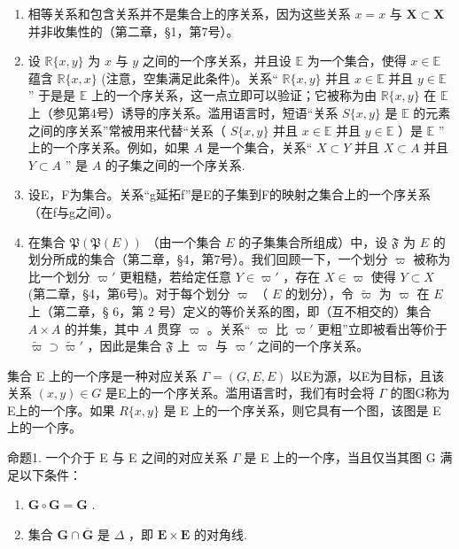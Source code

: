\begin{enumerate}
\def\labelenumi{(\arabic{enumi})}
\item
  相等关系和包含关系并不是集合上的序关系，因为这些关系 \(x = x\) 与 \(\mathbf{X} \subset \mathbf{X}\) 并非收集性的（第二章，§1，第7号）。
\item
  设 \(\mathbb{R}\{x, y\}\) 为 \(x\) 与 \(y\) 之间的一个序关系，并且设 \(\mathbb{E}\) 为一个集合，使得 \(x \in \mathbb{E}\) 蕴含 \(\mathbb{R}\{x, x\}\) (注意，空集满足此条件)。关系“ \(\mathbb{R}\{x, y\}\) 并且 \(x \in \mathbb{E}\) 并且 \(y \in \mathbb{E}\) '' 于是是 \(\mathbb{E}\) 上的一个序关系，这一点立即可以验证；它被称为由 \(\mathbb{R}\{x, y\}\) 在 \(\mathbb{E}\) 上（参见第4号）诱导的序关系。滥用语言时，短语“关系 \(S\{x, y\}\) 是 \(\mathbb{E}\) 的元素之间的序关系”常被用来代替“关系（ \(S\{x, y\}\) 并且 \(x \in \mathbb{E}\) 并且 \(y \in \mathbb{E}\) ）是 \(\mathbb{E}\) '' 上的一个序关系。例如，如果 \(A\) 是一个集合，关系“ \(X \subset Y\) 并且 \(X \subset A\) 并且 \(Y \subset A\) '' 是 \(A\) 的子集之间的一个序关系.
\item
  设E，F为集合。关系“g延拓f”是E的子集到F的映射之集合上的一个序关系（在f与g之间）。
\item
  在集合 \(\mathfrak{P}(\mathfrak{P}(E))\) （由一个集合 \(E\) 的子集集合所组成）中，设 \(\mathfrak{F}\) 为 \(E\) 的划分所成的集合（第二章，§4，第7号）。我们回顾一下，一个划分 \(\varpi\) 被称为比一个划分 \(\varpi'\) 更粗糙，若给定任意 \(Y \in \varpi'\) ，存在 \(X \in \varpi\) 使得 \(Y \subset X\) (第二章，§4，第6号)。对于每个划分 \(\varpi\) （ \(E\) 的划分），令 \(\tilde{\varpi}\) 为 \(\varpi\) 在 \(E\) 上（第二章，§ 6，第 2 号）定义的等价关系的图，即（互不相交的）集合 \(A \times A\) 的并集，其中 \(A\) 贯穿 \(\varpi\) 。关系“ \(\varpi\) 比 \(\varpi'\) 更粗”立即被看出等价于 \(\tilde{\varpi} \supset \tilde{\varpi}'\) ，因此是集合 \(\mathfrak{F}\) 上 \(\varpi\) 与 \(\varpi'\) 之间的一个序关系。
\end{enumerate}

集合 E 上的一个序是一种对应关系 \(\Gamma = (G, E, E)\) 以E为源，以E为目标，且该关系 \((x, y) \in G\) 是E上的一个序关系。滥用语言时，我们有时会将 \(\Gamma\) 的图G称为E上的一个序。如果 \(R\{x, y\}\) 是 E 上的一个序关系，则它具有一个图，该图是 E 上的一个序。

命题1. 一个介于 E 与 E 之间的对应关系 \(\Gamma\) 是 E 上的一个序，当且仅当其图 G 满足以下条件：

\begin{enumerate}
\def\labelenumi{(\alph{enumi})}
\item
  \(\mathbf{G} \circ \mathbf{G} = \mathbf{G}\) .
\item
  集合 \(\mathbf{G} \cap \overline{\mathbf{G}}\) 是 \(\Delta\) ，即 \(\mathbf{E} \times \mathbf{E}\) 的对角线.
\end{enumerate}

